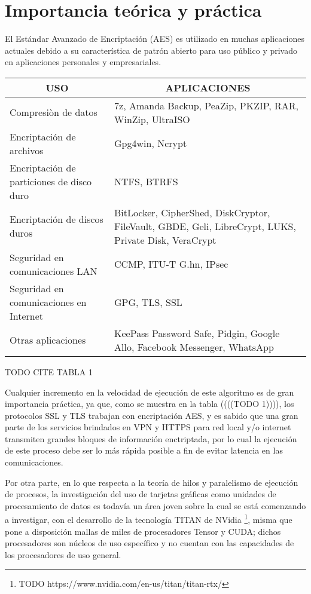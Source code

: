 \documentclass[../main.tex]{subfiles}
\begin{document}
  \section{Importancia teórica y práctica}

  El Estándar Avanzado de Encriptación (AES) es utilizado en muchas aplicaciones actuales debido a su característica de patrón abierto para uso público y privado en aplicaciones personales y empresariales.

  \begin{table}[]
    \begin{tabular}{|p{6cm}|p{8cm}|}
      \hline
      \multicolumn{1}{|c|}{\textbf{USO}} & \multicolumn{1}{c|}{\textbf{APLICACIONES}}       \\ \hline
      Compresiòn de datos & 7z, Amanda Backup, PeaZip, PKZIP, RAR, WinZip, UltraISO 
      \\ \hline
      Encriptación de archivos & Gpg4win, Ncrypt
      \\ \hline
      Encriptación de particiones de disco duro & NTFS, BTRFS
      \\ \hline
      Encriptación de discos duros & BitLocker, CipherShed, DiskCryptor, FileVault, GBDE, Geli, LibreCrypt, LUKS, Private Disk, VeraCrypt
      \\ \hline
      Seguridad en comunicaciones LAN & CCMP, ITU-T G.hn, IPsec
      \\ \hline
      Seguridad en comunicaciones en Internet & GPG, TLS, SSL
      \\ \hline
      Otras aplicaciones & KeePass Password Safe, Pidgin, Google Allo, Facebook Messenger, WhatsApp
      \\ \hline
    \end{tabular}
  \end{table}
  TODO CITE TABLA 1 \cite{book:design_rijndael}

  Cualquier incremento en la velocidad de ejecución de este algoritmo es de gran importancia práctica, ya que, como se muestra en la tabla ((((TODO 1)))), los protocolos SSL y TLS trabajan con encriptación AES, y es sabido que una gran parte de los servicios brindados en VPN y HTTPS para red local y/o internet transmiten grandes bloques de información enctriptada, por lo cual la ejecución de este proceso debe ser lo más rápida posible a fin de evitar latencia en las comunicaciones.

  Por otra parte, en lo que respecta a la teoría de hilos y paralelismo de ejecución de procesos, la investigación del uso de tarjetas gráficas como unidades de procesamiento de datos es todavía un área joven sobre la cual se está comenzando a investigar, con el desarrollo de la tecnología TITAN de NVidia \footnote{TODO https://www.nvidia.com/en-us/titan/titan-rtx/}, misma que pone a disposición mallas de miles de procesadores Tensor y CUDA; dichos procesadores son núcleos de uso específico y no cuentan con las capacidades de los procesadores de uso general.
\end{document}
